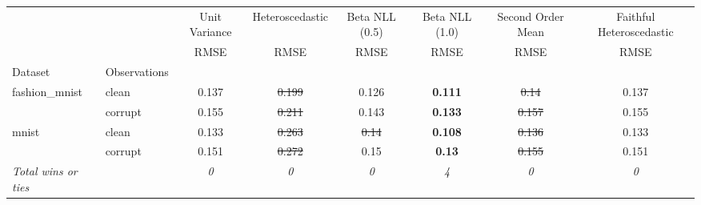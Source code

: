 \begin{tabular}{ll|c|c|c|c|c|c}
\toprule
{} & {} & {Unit Variance} & {Heteroscedastic} & {Beta NLL (0.5)} & {Beta NLL (1.0)} & {Second Order Mean} & {Faithful Heteroscedastic} \\
{} & {} & {RMSE} & {RMSE} & {RMSE} & {RMSE} & {RMSE} & {RMSE} \\
{Dataset} & {Observations} & {} & {} & {} & {} & {} & {} \\
\midrule
\multirow[t]{2}{*}{fashion_mnist} & clean & 0.137 & \sout{0.199} & 0.126 & \textbf{0.111} & \sout{0.14} & 0.137 \\
 & corrupt & 0.155 & \sout{0.211} & 0.143 & \textbf{0.133} & \sout{0.157} & 0.155 \\
\multirow[t]{2}{*}{mnist} & clean & 0.133 & \sout{0.263} & \sout{0.14} & \textbf{0.108} & \sout{0.136} & 0.133 \\
 & corrupt & 0.151 & \sout{0.272} & 0.15 & \textbf{0.13} & \sout{0.155} & 0.151 \\
\textit{{Total wins or ties}} &  & \textit{0} & \textit{0} & \textit{0} & \textit{4} & \textit{0} & \textit{0} \\
\bottomrule
\end{tabular}
